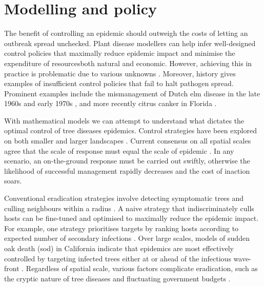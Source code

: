 \section{Modelling and policy}
\label{sec:modelling-and-policy}


The benefit of controlling an epidemic should outweigh the costs of letting an outbreak spread unchecked. 
Plant disease modellers can help infer well-designed control policies that maximally reduce epidemic impact and minimise the expenditure
of resources\textemdash both natural and economic. However, achieving this in practice is problematic due to various unknowns \cite{13-challenges}.
Moreover, history gives examples of insufficient control policies that fail to halt pathogen spread. 
Prominent examples include the mismanagement of Dutch elm disease in the late 1960s and early 1970s \cite{dutch-elm-mismanage}, and more recently citrus canker in Florida \cite{schubert2001meeting}.

With mathematical models we can attempt to understand what dictates the optimal control of tree diseases epidemics. 
Control strategies have been explored on both smaller \cite{risk-potential-control} 
and larger landscapes \cite{large-scale-control2}. Current consensus on all spatial scales
agree that the scale of response must equal the scale of epidemic \cite{control-scale-matching}. In any scenario, 
an on-the-ground response must be carried out swiftly, otherwise the likelihood of successful management rapidly decreases and the cost of inaction soars.

Conventional eradication strategies involve detecting symptomatic trees and culling neighbours within a radius \cite{WEBIDEMICS}.
A naive strategy that indiscriminately culls hosts can be fine-tuned and optimised to maximally reduce the epidemic impact. 
For example, one strategy prioritises targets by ranking hosts according to expected number of secondary infections \cite{risk-potential-control}.
Over large scales, models of sudden oak death (\acrshort{sod}) in California indicate that epidemics are most effectively controlled by targeting infected trees either at or ahead of the infectious wave-front \cite{large-scale-control}.
Regardless of spatial scale, various factors complicate eradication, such as the cryptic nature of tree diseases and fluctuating government budgets \cite{control-theory, control-theory-application}.

